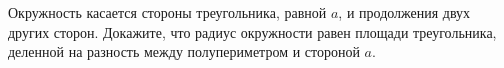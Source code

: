 \begin{ex}
	\begin{condition}
		Окружность касается стороны треугольника, равной \( a \), и продолжения двух других сторон. Докажите, что радиус окружности равен площади треугольника, деленной на разность между полупериметром и стороной \( a \).
	\end{condition}
\end{ex}